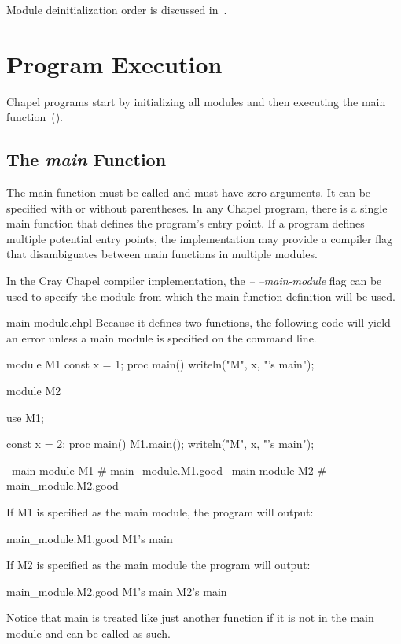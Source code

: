 
Module deinitialization order is discussed
in~.


\section{Program Execution}
\label{Program_Execution}

Chapel programs start by initializing all modules and then executing
the main function~().

\subsection{The {\em main} Function}
\label{The_main_Function}

The main function must be called  and must have zero
arguments.  It can be specified with or without parentheses.  In any
Chapel program, there is a single main function that defines the
program's entry point.  If a program defines multiple potential entry
points, the implementation may provide a compiler flag that
disambiguates between main functions in multiple modules.

\begin{craychapel}
In the Cray Chapel compiler implementation, the \emph{--
--main-module} flag can be used to specify the module from which the
main function definition will be used.
\end{craychapel}

\begin{chapelexample}{main-module.chpl}
Because it defines two  functions, the following code will yield an
error unless a main module is specified on the command line.
\begin{chapel}
module M1 {
  const x = 1;
  proc main() {
    writeln("M", x, "'s main");
  }
}
 
module M2 {
  use M1;

  const x = 2;
  proc main() {
    M1.main();
    writeln("M", x, "'s main");
  }
}
\end{chapel}
\begin{chapelcompopts}
--main-module M1 \# main\_module.M1.good
--main-module M2 \# main\_module.M2.good
\end{chapelcompopts}
If M1 is specified as the main module, the program will output:
\begin{chapelprintoutput}{main_module.M1.good}
M1's main
\end{chapelprintoutput}
If M2 is specified as the main module the program will output:
\begin{chapelprintoutput}{main_module.M2.good}
M1's main
M2's main
\end{chapelprintoutput}
Notice that main is treated like just another function if it is not in
the main module and can be called as such.
\end{chapelexample}

